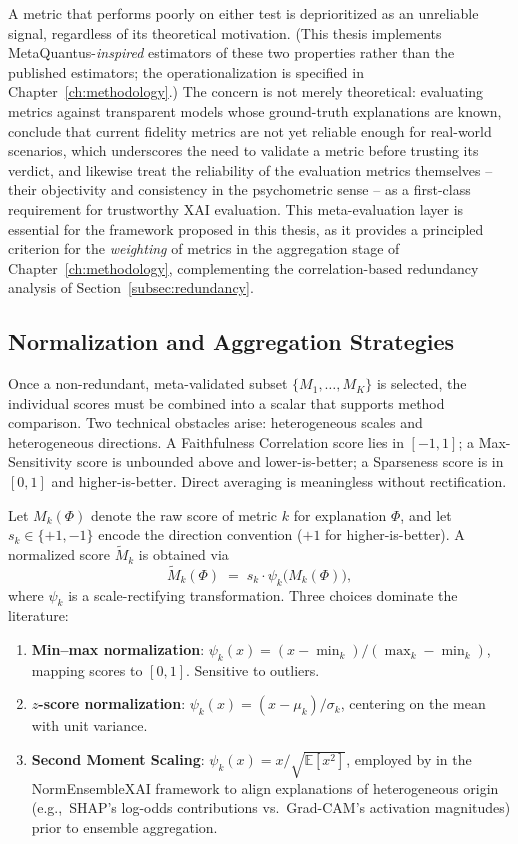 A metric that performs poorly on either test is deprioritized as an unreliable
signal, regardless of its theoretical motivation. (This thesis implements
MetaQuantus-\emph{inspired} estimators of these two properties rather than
the published estimators; the operationalization is specified in
Chapter~\ref{ch:methodology}.) The concern is not merely
theoretical: evaluating metrics against transparent models whose ground-truth
explanations are known, \citet{miro2025fidelity} conclude that current
fidelity metrics are not yet reliable enough for real-world scenarios, which
underscores the need to validate a metric before trusting its verdict, and
\citet{fresz2024classification} likewise treat the reliability of the
evaluation metrics themselves -- their objectivity and consistency in the
psychometric sense -- as a first-class requirement for trustworthy XAI
evaluation. This
meta-evaluation layer
is essential for the framework proposed in this thesis, as it provides a
principled criterion for the \emph{weighting} of metrics in the aggregation
stage of Chapter~\ref{ch:methodology},
complementing the correlation-based redundancy analysis of
Section~\ref{subsec:redundancy}.

\subsection{Normalization and Aggregation Strategies}
\label{subsec:aggregation-strategies}

Once a non-redundant, meta-validated subset $\{M_1, \dots, M_K\}$ is selected,
the individual scores must be combined into a scalar that supports method
comparison. Two technical obstacles arise: heterogeneous scales and
heterogeneous directions. A Faithfulness Correlation score lies in $[-1, 1]$;
a Max-Sensitivity score is unbounded above and lower-is-better; a Sparseness
score is in $[0, 1]$ and higher-is-better. Direct averaging is meaningless
without rectification.

Let $M_k(\Phi)$ denote the raw score of metric $k$ for explanation $\Phi$, and
let $s_k \in \{+1, -1\}$ encode the direction convention ($+1$ for
higher-is-better). A normalized score $\tilde{M}_k$ is obtained via
$$
\tilde{M}_k(\Phi) \;=\; s_k \cdot \psi_k\!\bigl(M_k(\Phi)\bigr),
$$
where $\psi_k$ is a scale-rectifying transformation. Three choices dominate
the literature:
\begin{enumerate}
    \item \textbf{Min--max normalization}:
    $\psi_k(x) = (x - \min_k) / (\max_k - \min_k)$, mapping scores to $[0, 1]$.
    Sensitive to outliers.
    \item \textbf{$z$-score normalization}:
    $\psi_k(x) = (x - \mu_k) / \sigma_k$, centering on the mean with unit
    variance.
    \item \textbf{Second Moment Scaling}:
    $\psi_k(x) = x / \sqrt{\mathbb{E}[x^2]}$, employed by
    \citet{hryniewska2024normensemblexai} in the NormEnsembleXAI framework to
    align explanations of heterogeneous origin (e.g.,\ SHAP's log-odds
    contributions vs.\ Grad-CAM's activation magnitudes) prior to ensemble
    aggregation.
\end{enumerate}

